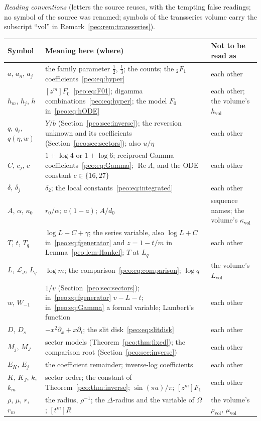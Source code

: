 \documentclass[11pt]{article}
\numberwithin{equation}{section}
\theoremstyle{remark}\newtheorem{remark}[theorem]{Remark}
\newcommand{\Li}{\mathcal L}
\DeclareMathOperator{\Ree}{Re}
\begin{document}
\medskip\noindent\begin{minipage}{\textwidth}
\emph{Reading conventions} (letters the source reuses, with the tempting
false readings; no symbol of the source was renamed; symbols of the
transseries volume carry the subscript ``vol'' in
Remark~\ref{peo:rem:transseries}).\par
\smallskip
\begingroup\small\renewcommand{\arraystretch}{1.1}
\noindent\begin{tabular}{@{}>{\raggedright\arraybackslash}p{0.95in}>{\raggedright\arraybackslash}p{3.35in}>{\raggedright\arraybackslash}p{1.8in}@{}}
\toprule
Symbol & Meaning here (where) & Not to be read as\\
\midrule
$a$, $a_n$, $a_j$ & the family parameter $\tfrac12$, $\tfrac13$; the counts; the ${}_2F_1$ coefficients~\eqref{peo:eq:hyper} & each other\\
$h_m$, $h_j$, $h$ & $[z^m]F_0$~\eqref{peo:eq:F01}; digamma combinations~\eqref{peo:eq:hyper}; the model $F_0$ in~\eqref{peo:eq:hODE} & each other; the volume's $h_{\mathrm{vol}}$\\
$q$, $q_\ell$, $q(\eta,w)$ & $Y/b$ (Section~\ref{peo:sec:inverse}); the reversion unknown and its coefficients (Section~\ref{peo:sec:sectors}); also $u/\eta$ & each other\\
$C$, $c_j$, $c$ & $1+\log4$ or $1+\log6$; reciprocal-Gamma coefficients~\eqref{peo:eq:Gamma}; $\Ree\Lambda$, and the ODE constant $c\in\{16,27\}$ & each other\\
$\delta$, $\delta_j$ & $\delta_2$; the local constants~\eqref{peo:eq:integrated} & each other\\
$A$, $\alpha$, $\kappa_0$ & $r_0/\alpha$; $a(1-a)$; $A/d_0$ & sequence names; the volume's $\kappa_{\mathrm{vol}}$\\
$T$, $t$, $T_q$ & $\log L+C+\gamma$; the series variable, also $\log L+C$ in~\eqref{peo:eq:fgenerator} and $z=1-t/m$ in Lemma~\ref{peo:lem:Hankel}; $T$ at $L_q$ & each other\\
$L$, $\Li_J$, $L_q$ & $\log m$; the comparison~\eqref{peo:eq:comparison}; $\log q$ & the volume's $L_{\mathrm{vol}}$\\
$w$, $W_{-1}$ & $1/v$ (Section~\ref{peo:sec:sectors}); in~\eqref{peo:eq:fgenerator} $v-L-t$; in~\eqref{peo:eq:Gamma} a formal variable; Lambert's function & each other\\
$D$, $D_s$ & $-x^2\partial_x+x\partial_t$; the slit disk~\eqref{peo:eq:slitdisk} & each other\\
$M_j$, $M_J$ & sector models (Theorem~\ref{peo:thm:fixed}); the comparison root (Section~\ref{peo:sec:inverse}) & each other\\
$E_K$, $E_j$ & the coefficient remainder; inverse-log coefficients & each other\\
$K$, $K_J$, $k$, $k_m$ & sector order; the constant of Theorem~\ref{peo:thm:inverse}; $\sin(\pi a)/\pi$; $[z^m]F_1$ & each other\\
$\rho$, $\mu$, $r$, $r_m$ & the radius, $\rho^{-1}$; the $\Delta$-radius and the variable of $\Omega$; $[t^m]R$ & the volume's $\rho_{\mathrm{vol}}$, $\mu_{\mathrm{vol}}$\\
\bottomrule
\end{tabular}
\endgroup
\end{minipage}
\end{document}

